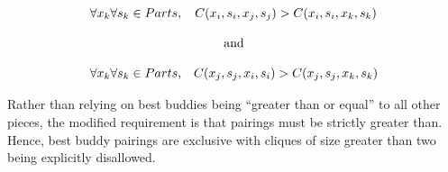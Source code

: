\documentclass{report}
\begin{document}
\begin{equation} \label{eq:hammoudehBestBuddyDefinition}
\begin{split}
\begin{matrix}
\forall{x_k} \forall{s_k} \in Parts, & C(x_i, s_i, x_j, s_j) > C(x_i, s_i, x_k, s_k)
\\
\\
\multicolumn{2}{c}{\textnormal{and}}
\\
\\
\forall{x_k} \forall{s_k} \in Parts, & C(x_j, s_j, x_i, s_i) > C(x_j, s_j, x_k, s_k)
\end{matrix}
\end{split}
\end{equation}

Rather than relying on best buddies being ``greater than or equal'' to all other pieces, the modified requirement is that pairings must be strictly greater than.  Hence, best buddy pairings are exclusive with cliques of size greater than two being explicitly disallowed.

\pagebreak


\end{document}
